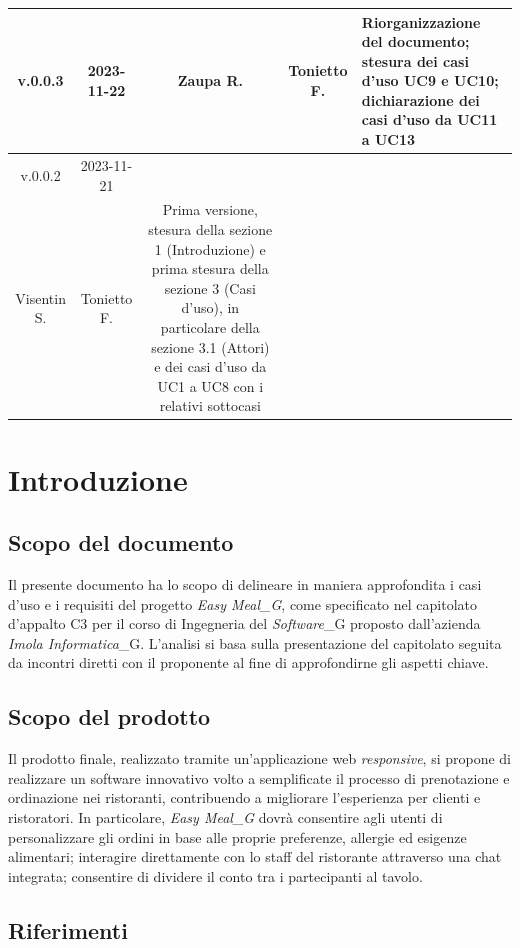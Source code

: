 \documentclass[12pt, oneside]{article}
\begin{document}
\begin{longtable}{|c|c|c|c|p{7cm}|}
\hline
v.0.0.3 & 2023-11-22 & Zaupa R. & Tonietto F. & Riorganizzazione del documento; stesura dei casi d'uso UC9 e UC10; dichiarazione dei casi d'uso da UC11 a UC13 \\
\hline
v.0.0.2 & 2023-11-21 & 
  \begin{tabular}[c]{@{}c@{}}
    Zaupa R. \\
    Visentin S.
  \end{tabular} 
  & Tonietto F. & Prima versione, stesura della sezione 1 (Introduzione) e prima stesura della sezione 3 (Casi d'uso), in particolare della sezione 3.1 (Attori) e dei casi d'uso da UC1 a UC8 con i relativi sottocasi\\
\hline
\end{longtable}
\newpage

\tableofcontents
\newpage

\section{Introduzione}
\subsection{Scopo del documento}
Il presente documento ha lo scopo di delineare in maniera approfondita i casi d'uso e i requisiti del progetto \textit{\textit{Easy Meal}_G}, come specificato nel capitolato d'appalto C3 per il corso di Ingegneria del \textit{Software}_G proposto dall'azienda \textit{Imola Informatica}_G.
L'analisi si basa sulla presentazione del capitolato seguita da incontri diretti con il proponente al fine di approfondirne gli aspetti chiave.
\subsection{Scopo del prodotto}
Il prodotto finale, realizzato tramite un'applicazione web \emph{responsive}, si propone di realizzare un software innovativo volto a semplificate il processo di prenotazione e ordinazione nei ristoranti, contribuendo a migliorare l'esperienza per clienti e ristoratori. In particolare, \textit{\textit{Easy Meal}_G} dovrà consentire agli utenti di personalizzare gli ordini in base alle proprie preferenze, allergie ed esigenze alimentari; interagire direttamente con lo staff del ristorante attraverso una chat integrata; consentire di dividere il conto tra i partecipanti al tavolo.
\subsection{Riferimenti}
\end{document}
